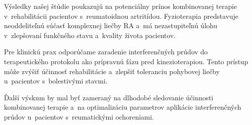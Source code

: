 
\vspace{1cm}

Výsledky našej štúdie poukazujú na potenciálny prínos kombinovanej terapie v~rehabilitácii pacientov s~reumatoidnou artritídou. Fyzioterapia predstavuje neoddeliteľnú súčasť komplexnej liečby RA a~má nezastupiteľnú úlohu v~zlepšovaní funkčného stavu a~kvality života pacientov.

Pre klinickú prax odporúčame zaradenie interferenčných prúdov do terapeutického protokolu ako prípravnú fázu pred kinezioterapiou. Tento prístup môže zvýšiť účinnosť rehabilitácie a~zlepšiť toleranciu pohybovej liečby u~pacientov s~bolestivými stavmi.

Ďalší výskum by mal byť zameraný na dlhodobé sledovanie účinnosti kombinovanej terapie a~na optimalizáciu parametrov aplikácie interferenčných prúdov u~pacientov s~reumatickými ochoreniami.

\clearpage
